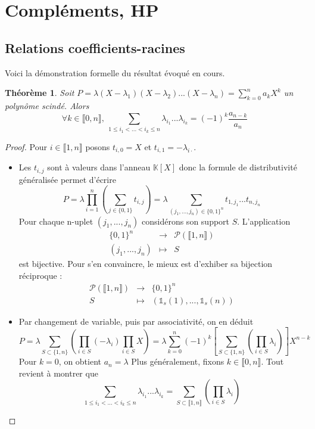 \documentclass[french]{book}
\theoremstyle{plain}
\newtheorem{thm}{Théorème}[chapter]
\theoremstyle{definition}
\theoremstyle{remark}
\begin{document}
\section{Compléments, HP}
\subsection{Relations coefficients-racines}
Voici la démonstration formelle du résultat évoqué en cours.

\begin{thm}
	Soit $\displaystyle P=\lambda(X-\lambda_{1})(X-\lambda_{2})...(X-\lambda_{n})=\sum_{k=0}^{n}a_{k}X^{k}$ un polynôme scindé. Alors $$\forall k\in\llbracket0,n\rrbracket,\ \sum_{1\le i_{1}<...<i_{k}\le n}\lambda_{i_{1}}...\lambda_{i_{k}}=(-1)^{k}\frac{a_{n-k}}{a_{n}}$$
\end{thm}
\begin{proof}
	Pour $i\in\llbracket1,n\rrbracket$ posons $t_{i,0}=X$ et $t_{i,1}=-\lambda_{i\cdot}$.
	\begin{itemize}
		\item Les \(t_{i,j}\) sont à valeurs dans l'anneau \(\mathbb{K}[X]\) donc la formule de distributivité généralisée permet d'écrire $$P=\lambda\prod_{i=1}^{n}\left(\sum_{j\in\{0,1\}}t_{i,j}\right)=\lambda\sum_{(j_{1},...,j_{n})\in\{0,1\}^{n}}t_{1,j_{1}}...t_{n,j_{n}}$$ Pour chaque n-uplet \((j_{1},...,j_{n})\) considérons son support $S$. L'application $$\begin{array}{ccc}
			\{0,1\}^{n}&\rightarrow&\mathcal{P}(\llbracket1,n\rrbracket)\\
			(j_{1},...,j_{n})&\mapsto& S
		\end{array}$$
		est bijective. Pour s'en convaincre, le mieux est d'exhiber sa bijection réciproque :
		$$
		\begin{array}{ccc}
			\mathcal{P}(\llbracket1,n\rrbracket)&\rightarrow&\{0,1\}^{n}\\
			S&\mapsto&(\mathds{1}_{s}(1),...,\mathds{1}_{s}(n))
		\end{array}$$
		\item Par changement de variable, puis par associativité, on en déduit
		$$P=\lambda\sum_{S\subset\{1,n\}}\left(\prod_{i\in S}(-\lambda_{i})\prod_{i\in S}X\right)=\lambda\sum_{k=0}^{n}(-1)^{k}\left[\sum_{S\subset\{1,n\}}\left(\prod_{i\in S}\lambda_{i}\right)\right]X^{n-k}$$
		Pour $k=0$, on obtient $a_{n}=\lambda$ Plus généralement, fixons $k\in\llbracket0,n\rrbracket$. Tout revient à montrer que
		$$\sum_{1\le i_{1}<...<i_{k}\le n}\lambda_{i_{1}}...\lambda_{i_{k}}=\sum_{S\subset\llbracket1,n\rrbracket}\left(\prod_{i\in S}\lambda_{i}\right)$$

\end{itemize}
\end{proof}
\end{document}

